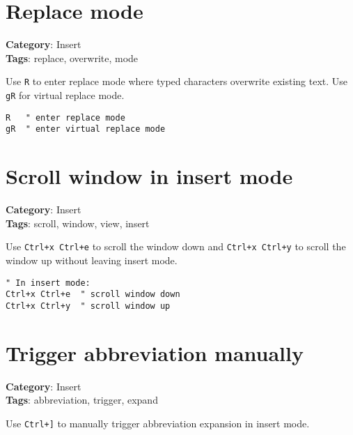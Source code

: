 {{{{{{\section{Replace mode}

\textbf{Category}: Insert\\ \textbf{Tags}: replace, overwrite, mode
\vspace{0.5cm}

Use {\footnotesize \Verb§R§} to enter replace mode where typed characters overwrite existing text. Use {\footnotesize \Verb§gR§} for virtual replace mode.

\begin{Exa*}{}
\begin{Verbatim}[fontsize=\footnotesize, breaklines, breakanywhere]
R   " enter replace mode
gR  " enter virtual replace mode
\end{Verbatim}
\end{Exa*}

\section{Scroll window in insert mode}

\textbf{Category}: Insert\\ \textbf{Tags}: scroll, window, view, insert
\vspace{0.5cm}

Use {\footnotesize \Verb§Ctrl+x Ctrl+e§} to scroll the window down and {\footnotesize \Verb§Ctrl+x Ctrl+y§} to scroll the window up without leaving insert mode.

\begin{Exa*}{}
\begin{Verbatim}[fontsize=\footnotesize, breaklines, breakanywhere]
" In insert mode:
Ctrl+x Ctrl+e  " scroll window down
Ctrl+x Ctrl+y  " scroll window up
\end{Verbatim}
\end{Exa*}

\section{Trigger abbreviation manually}

\textbf{Category}: Insert\\ \textbf{Tags}: abbreviation, trigger, expand
\vspace{0.5cm}

Use {\footnotesize \Verb§Ctrl+]§} to manually trigger abbreviation expansion in insert mode.

}}}}}}
